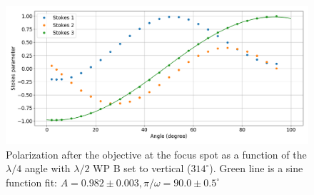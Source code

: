 \documentclass[english, a4paper, 12pt, twoside]{book}
\numberwithin{equation}{section} %
\begin{document}
\begin{appendices}
\begin{figure}[H]
\label{pol1}
\end{figure}
\begin{figure}[H]
\centering
\includegraphics[width = \textwidth]{pol2}
\caption{Polarization after the objective at the focus spot as a function of the $\lambda/4$ angle with $\lambda/2$ WP B set to vertical ($314^\circ$). Green line is a sine function fit: $A = 0.982 \pm 0.003,\pi/\omega = 90.0 \pm 0.5^\circ$}
\label{pol2}
\end{figure}
\end{appendices}
\end{document}

